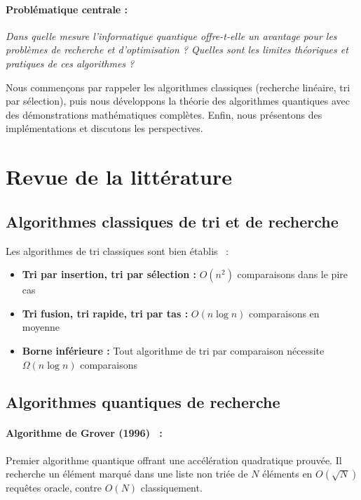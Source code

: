 \documentclass[12pt,a4paper]{article}
\theoremstyle{definition}
\theoremstyle{remark}
\begin{document}
\paragraph{Problématique centrale :}
\textit{Dans quelle mesure l'informatique quantique offre-t-elle un avantage pour les problèmes de recherche et d'optimisation ? Quelles sont les limites théoriques et pratiques de ces algorithmes ?}

Nous commençons par rappeler les algorithmes classiques (recherche linéaire, tri par sélection), puis nous développons la théorie des algorithmes quantiques avec des démonstrations mathématiques complètes. Enfin, nous présentons des implémentations et discutons les perspectives.

\newpage

\section{Revue de la littérature}

\subsection{Algorithmes classiques de tri et de recherche}

Les algorithmes de tri classiques sont bien établis~\cite{cormen2009algorithms} :
\begin{itemize}
    \item \textbf{Tri par insertion, tri par sélection :} $O(n^2)$ comparaisons dans le pire cas
    \item \textbf{Tri fusion, tri rapide, tri par tas :} $O(n \log n)$ comparaisons en moyenne
    \item \textbf{Borne inférieure :} Tout algorithme de tri par comparaison nécessite $\Omega(n \log n)$ comparaisons~\cite{cormen2009algorithms}
\end{itemize}

\subsection{Algorithmes quantiques de recherche}

\paragraph{Algorithme de Grover (1996)~\cite{grover1996} :}
Premier algorithme quantique offrant une accélération quadratique prouvée. Il recherche un élément marqué dans une liste non triée de $N$ éléments en $O(\sqrt{N})$ requêtes oracle, contre $O(N)$ classiquement.
\end{document}
